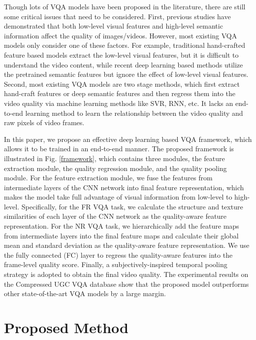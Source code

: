 \documentclass{article}
\begin{document}
Though lots of VQA models have been proposed in the literature, there are still some critical issues that need to be considered. First, previous studies \cite{gao2017deepsim}\cite{sun2019mc360iqa} have demonstrated that both low-level visual features and high-level semantic information affect the quality of images/videos. However, most existing VQA models only consider one of these factors. For example, traditional hand-crafted feature based models \cite{saad2014blind}\cite{korhonen2019two} extract the low-level visual features, but it is difficult to understand the video content, while recent deep learning based methods  \cite{li2019quality}\cite{chen2020rirnet} utilize the pretrained semantic features but ignore the effect of low-level visual features. Second, most existing VQA models are two stage methods, which first extract hand-craft features or deep semantic features and then regress them into the video quality via machine learning methods like SVR, RNN, etc. It lacks an end-to-end learning method to learn the relationship between the video quality and raw pixels of video frames. 

In this paper, we propose an effective deep learning based VQA framework, which allows it to be trained in an end-to-end manner. The proposed framework is illustrated in Fig. \ref{framework}, which contains three modules, the feature extraction module, the quality regression module, and the quality pooling module. For the feature extraction module, we fuse the features from intermediate layers of the CNN network into final feature representation, which makes the model take full advantage of visual information from low-level to high-level. Specifically, for the FR VQA task, we calculate the structure and texture similarities of each layer of the CNN network as the quality-aware feature representation. For the NR VQA task, we hierarchically add the feature maps from intermediate layers into the final feature maps and calculate their global mean and standard deviation as the quality-aware feature representation. We use the fully connected (FC) layer to regress the quality-aware features into the frame-level quality score. Finally, a subjectively-inspired temporal pooling strategy is adopted to obtain the final video quality. The experimental results on the Compressed UGC VQA database show that the proposed model outperforms other state-of-the-art VQA models by a large margin.

\section{Proposed Method}
\end{document}
